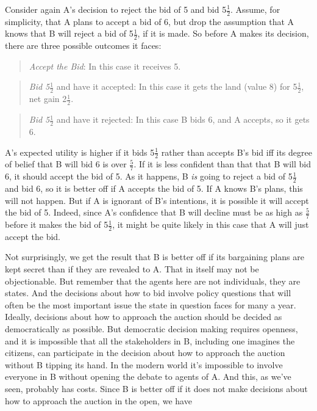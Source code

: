 \documentclass[
  10pt,
  letterpaper,
  DIV=11,
  numbers=noendperiod,
  twoside]{scrartcl}
\begin{document}
Consider again A's decision to reject the bid of 5 and bid
5\(\frac{1}{2}\). Assume, for simplicity, that A plans to accept a bid
of 6, but drop the assumption that A knows that B will reject a bid of
5\(\frac{1}{2}\), if it is made. So before A makes its decision, there
are three possible outcomes it faces:

\begin{quote}
\emph{Accept the Bid}: In this case it receives 5.
\end{quote}

\begin{quote}
\emph{Bid 5}\(\frac{1}{2}\) and have it accepted: In this case it gets
the land (value 8) for 5\(\frac{1}{2}\), net gain 2\(\frac{1}{2}\).
\end{quote}

\begin{quote}
\emph{Bid 5}\(\frac{1}{2}\) and have it rejected: In this case B bids 6,
and A accepts, so it gets 6.
\end{quote}

A's expected utility is higher if it bids 5\(\frac{1}{2}\) rather than
accepts B's bid iff its degree of belief that B will bid 6 is over
\(\frac{5}{7}\). If it is less confident than that that B will bid 6, it
should accept the bid of 5. As it happens, B \emph{is} going to reject a
bid of 5\(\frac{1}{2}\) and bid 6, so it is better off if A accepts the
bid of 5. If A knows B's plans, this will not happen. But if A is
ignorant of B's intentions, it is possible it will accept the bid of 5.
Indeed, since A's confidence that B will decline must be as high as
\(\frac{5}{7}\) before it makes the bid of 5\(\frac{1}{2}\), it might be
quite likely in this case that A will just accept the bid.

Not surprisingly, we get the result that B is better off if its
bargaining plans are kept secret than if they are revealed to A. That in
itself may not be objectionable. But remember that the agents here are
not individuals, they are states. And the decisions about how to bid
involve policy questions that will often be the most important issue the
state in question faces for many a year. Ideally, decisions about how to
approach the auction should be decided as democratically as possible.
But democratic decision making requires openness, and it is impossible
that all the stakeholders in B, including one imagines the citizens, can
participate in the decision about how to approach the auction without B
tipping its hand. In the modern world it's impossible to involve
everyone in B without opening the debate to agents of A. And this, as
we've seen, probably has costs. Since B is better off if it does not
make decisions about how to approach the auction in the open, we have
\end{document}
